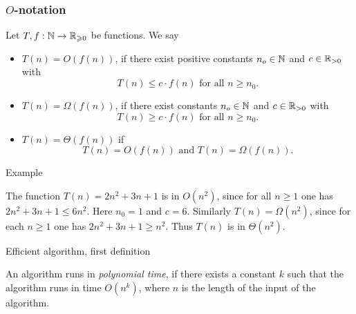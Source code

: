 \begin{frame}
  \frametitle{\boldmath $O$-notation}
  
\begin{definition}

 Let $T,f: \mathbb{N} \to \mathbb{R}_{\geqslant0}$ be functions. We say 
  \begin{itemize}
  \item \emph{$T(n) = O(f(n))$}, if there exist positive  constants
    $n_o\in \mathbb{N}$ and  $c\in\mathbb{R}_{>0}$ 
    with $$T(n) \leq c \cdot f(n) \text{ for all }n\geq n_0.$$  
  \item \emph{$T(n) = \Omega(f(n))$}, if there exist constants   $n_o\in \mathbb{N}$
    and  $c\in\mathbb{R}_{>0}$ 
    with $$T(n) \geq c \cdot f(n)\text{ for all } n\geq n_0.$$
  \item \emph{$T(n) = \Theta(f(n))$}  if $$T(n)=O(f(n))\text{ and }
     T(n) = \Omega(f(n)).$$
  \end{itemize}
\end{definition}


\end{frame}


\begin{frame}{Example}

  

\begin{example}
  The function $T(n)=2n^2 + 3n +1$ is in $O(n^2)$, since for all
  $n\geq1$ one has $2n^2 + 3n + 1 \leq 6n^2$. Here $n_0 = 1$ and $c =
  6$.  Similarly $T(n) = \Omega(n^2)$, since for each $n\geq1$ one has $2n^2 + 3n
  +1\geq n^2$. Thus $T(n)$ is in $\Theta(n^2)$. 
\end{example}
  
\end{frame}



\begin{frame}{Efficient algorithm, first definition}

  An algorithm runs in
\emph{polynomial time}, if there exists a constant $k$ such that the
algorithm runs in time $O(n^k)$, where $n$ is the length of the input 
of the algorithm.
  
\end{frame}



